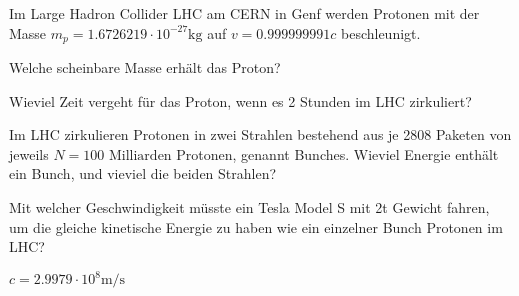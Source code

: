 Im Large Hadron Collider LHC am CERN in Genf werden Protonen
mit der Masse $m_p=1.6726219\cdot 10^{-27}\text{kg}$
auf $v=0.999999991c$ beschleunigt.
\begin{teilaufgaben}
\item Welche scheinbare Masse erhält das Proton?
\item Wieviel Zeit vergeht für das Proton, wenn es 2 Stunden im LHC
zirkuliert?
\item Im LHC zirkulieren Protonen in zwei Strahlen bestehend aus je
2808 Paketen von jeweils $N=100\text{ Milliarden}$ Protonen, genannt Bunches.
Wieviel Energie enthält ein Bunch, und vieviel die beiden Strahlen?
\item Mit welcher Geschwindigkeit müsste ein Tesla Model S mit 2t Gewicht
fahren, um die gleiche kinetische Energie zu haben wie ein einzelner Bunch
Protonen im LHC?
\end{teilaufgaben}

\begin{hinweis}
$c=2.9979\cdot 10^8\text{m/s}$
\end{hinweis}

